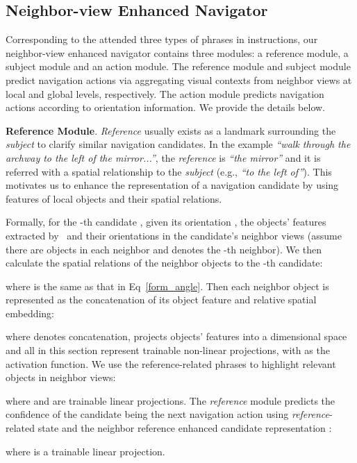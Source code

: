 \documentclass[sigconf]{acmart}
\begin{document}
\subsection{Neighbor-view Enhanced Navigator}
\label{sec_predictor}
Corresponding to the attended three types of phrases in instructions, our neighbor-view enhanced navigator contains three modules: a reference module, a subject module and an action module. The reference module and subject module predict navigation actions via aggregating visual contexts from neighbor views at local and global levels, respectively. The action module predicts navigation actions according to orientation information. We provide the details below. 


\vspace{1mm}
\noindent\textbf{Reference Module}. \textit{Reference} usually exists as a landmark surrounding the \textit{subject} to clarify similar navigation candidates. 
In the example \textit{``walk through the archway to the left of the mirror...''}, the \textit{reference} is \textit{``the mirror''} and it is referred with a spatial relationship to the \textit{subject} (e.g., \textit{``to the left of''}). 
This motivates us to enhance the representation of a navigation candidate by using features of local objects and their spatial relations.

Formally, for the -th candidate , given its orientation , the objects' features  extracted by~\cite{ren2015faster-rcnn} and their orientations  in the candidate's neighbor views (assume there are  objects in each neighbor and  denotes the -th neighbor). 
We then calculate the spatial relations of the neighbor objects to the -th candidate:

where  is the same as that in Eq~\eqref{form_angle}. Then each neighbor object is represented as the concatenation of its object feature and relative spatial embedding:

where  denotes concatenation,  projects objects' features into a  dimensional space and all  in this section represent trainable non-linear projections, with  as the activation function. We use the reference-related phrases  to highlight relevant objects in neighbor views:

where  and  are trainable linear projections. The \textit{reference} module predicts the confidence of the candidate  being the next navigation action using \textit{reference}-related state
 and the neighbor reference enhanced candidate representation :

where  is a trainable linear projection.
\end{document}
